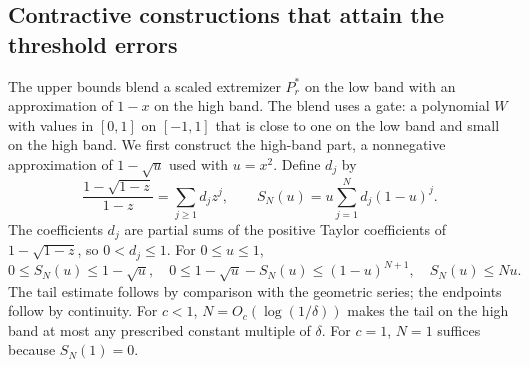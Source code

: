 \subsection{Contractive constructions that attain the threshold errors}
The upper bounds blend a scaled extremizer $P_r^*$ on the low band with an approximation of $1-x$ on the high band. The blend uses a gate: a polynomial $W$ with values in $[0,1]$ on $[-1,1]$ that is close to one on the low band and small on the high band. We first construct the high-band part, a nonnegative approximation of $1-\sqrt u$ used with $u=x^2$. Define $d_j$ by
\[
 \frac{1-\sqrt{1-z}}{1-z}=\sum_{j\geq1}d_jz^j,\qquad
 S_N(u)=u\sum_{j=1}^N d_j(1-u)^j.
\]
The coefficients $d_j$ are partial sums of the positive Taylor coefficients of $1-\sqrt{1-z}$, so $0<d_j\leq1$. For $0\leq u\leq1$,
\begin{equation}\label{eq:SN}
 0\leq S_N(u)\leq1-\sqrt u,\quad
 0\leq1-\sqrt u-S_N(u)\leq(1-u)^{N+1},\quad S_N(u)\leq Nu.
\end{equation}
The tail estimate follows by comparison with the geometric series; the endpoints follow by continuity. For $c<1$, $N=O_c(\log(1/\delta))$ makes the tail on the high band at most any prescribed constant multiple of $\delta$. For $c=1$, $N=1$ suffices because $S_N(1)=0$.

